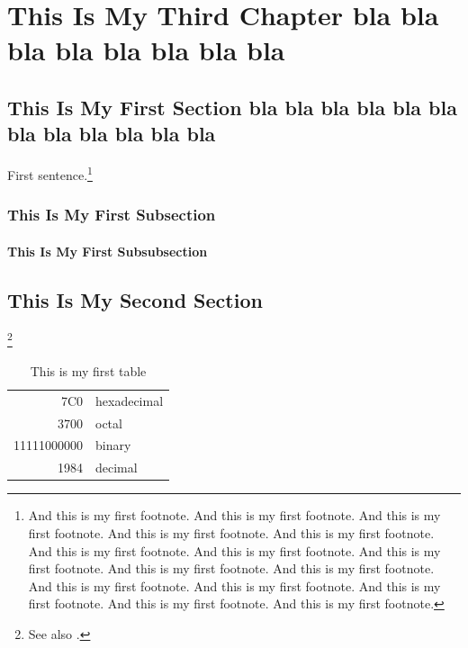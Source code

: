 % 

\chapter{This Is My Third Chapter bla bla bla bla bla bla bla bla}
\section{This Is My First Section bla bla bla bla bla bla bla bla bla bla bla bla }
\noindent
First sentence.\footnote{And this is my first footnote. And this is my first footnote. And this is my first footnote. And this is my first footnote. And this is my first footnote. And this is my first footnote. And this is my first footnote. And this is my first footnote. And this is my first footnote. And this is my first footnote. And this is my first footnote. And this is my first footnote. And this is my first footnote. And this is my first footnote. And this is my first footnote.}

\subsection{This Is My First Subsection}
\noindent
\cite{texbook} 







\subsubsection{This Is My First Subsubsection}
\noindent
\cite{texbook}







\section{This Is My Second Section}
\noindent
\footnote{See also \cite{Aup91,Dou72,Hal82}.}








\begin{table}[h]
  \begin{center}
\begin{tabular}{|r|l|}
  \hline
  7C0 & hexadecimal \\
  3700 & octal \\ \cline{2-2}
  11111000000 & binary \\
  \hline \hline
  1984 & decimal \\
  \hline
\end{tabular}
\caption{This is my first table}
\end{center}
\end{table}

